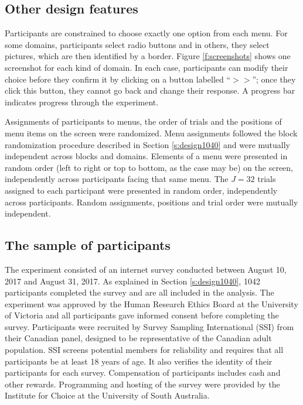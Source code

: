 \documentclass[11pt,letter]{article}
\newcommand{\menu}{menu}
\newcommand{\menus}{menus}
\begin{document}
\subsection{Other design features}

Participants are constrained to choose exactly one option from each \menu{}.
For some domains, participants select radio buttons and in others, they select pictures, which are then identified by a border.
Figure \ref{f:screenshots} shows one screenshot for each kind of domain.
In each case, participants can modify their choice before they confirm it by clicking on a button labelled ``$>>$''; once they click this button, they cannot go back and change their response.
A progress bar indicates progress through the experiment.

Assignments of participants to \menus{}, the order of trials and the positions of menu items on the screen were randomized.
Menu assignments followed the block randomization procedure described in Section \ref{s:design1040} and were mutually independent across blocks and domains.
Elements of a \menu{} were presented in random order (left to right or top to bottom, as the case may be) on the screen, independently across participants facing that same \menu{}.
The $J=32$ trials assigned to each participant were presented in random order, independently across participants.
Random assignments, positions and trial order were mutually independent.

\subsection{The sample of participants}

The experiment consisted of an internet survey conducted between August 10, 2017 and August 31, 2017.
As explained in Section \ref{s:design1040}, 1042 participants completed the survey and are all included in the analysis.
The experiment was approved by the Human Research Ethics Board at the University of Victoria and all participants gave informed consent before completing the survey.
Participants were recruited by Survey Sampling International (SSI) from their Canadian panel, designed to be representative of the Canadian adult population.
SSI screens potential members for reliability and requires that all participants be at least 18 years of age.
It also verifies the identity of their participants for each survey.
Compensation of participants includes cash and other rewards.
Programming and hosting of the survey were provided by the Institute for Choice at the University of South Australia.
\end{document}
